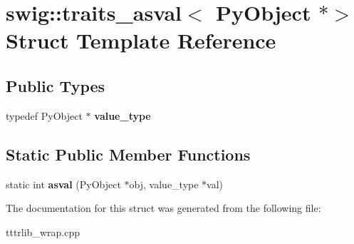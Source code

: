 \hypertarget{structswig_1_1traits__asval_3_01_py_object_01_5_4}{}\section{swig\+:\+:traits\+\_\+asval$<$ Py\+Object $\ast$$>$ Struct Template Reference}
\label{structswig_1_1traits__asval_3_01_py_object_01_5_4}
\subsection*{Public Types}
\begin{DoxyCompactItemize}
\item 
\mbox{\label{structswig_1_1traits__asval_3_01_py_object_01_5_4_a27a163991e96a33bcf1937a8ca435479}} 
typedef Py\+Object $\ast$ {\bfseries value\+\_\+type}
\end{DoxyCompactItemize}
\subsection*{Static Public Member Functions}
\begin{DoxyCompactItemize}
\item 
\mbox{\label{structswig_1_1traits__asval_3_01_py_object_01_5_4_aca155c255a1d5d8a00141cbc502f6197}} 
static int {\bfseries asval} (Py\+Object $\ast$obj, value\+\_\+type $\ast$val)
\end{DoxyCompactItemize}


The documentation for this struct was generated from the following file\+:\begin{DoxyCompactItemize}
\item 
tttrlib\+\_\+wrap.\+cpp\end{DoxyCompactItemize}
